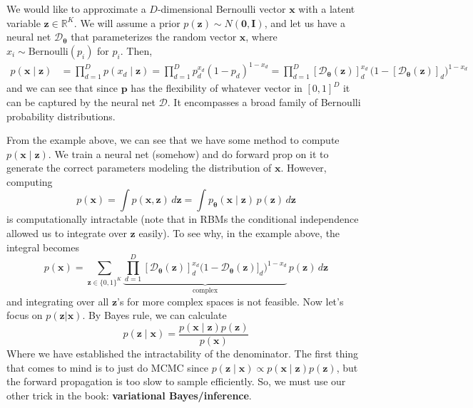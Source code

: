 \documentclass{article}
\begin{document}
    \begin{example} 
        We would like to approximate a $D$-dimensional Bernoulli vector $\mathbf{x}$ with a latent variable $\mathbf{z} \in \mathbb{R}^K$. We will assume a prior $p(\mathbf{z}) \sim N(\mathbf{0}, \mathbf{I})$, and let us have a neural net $\mathcal{D}_{\boldsymbol{\theta}}$ that parameterizes the random vector $\mathbf{x}$, where $x_i \sim \mathrm{Bernoulli}(p_i)$ for $p_i$. Then,
    \begin{align*}
        p(\mathbf{x} \mid \mathbf{z}) & = \prod_{d=1}^D p(x_d \mid \mathbf{z}) = \prod_{d=1}^D p_d^{x_d} (1 - p_d)^{1 - x_d} = \prod_{d=1}^D [\mathcal{D}_{\boldsymbol{\theta}} (\mathbf{z})]_d^{x_d} \, \big( 1 - [\mathcal{D}_{\boldsymbol{\theta}} (\mathbf{z})]_d\big)^{1 - x_d}
    \end{align*} 
    and we can see that since $\mathbf{p}$ has the flexibility of whatever vector in $[0, 1]^D$ it can be captured by the neural net $\mathcal{D}$. It encompasses a broad family of Bernoulli probability distributions. 
    \end{example}

    From the example above, we can see that we have some method to compute $p(\mathbf{x} \mid \mathbf{z})$. We train a neural net (somehow) and do forward prop on it to generate the correct parameters modeling the distribution of $\mathbf{x}$. However, computing 
    \[p(\mathbf{x}) = \int p(\mathbf{x}, \mathbf{z}) \,d\mathbf{z} = \int p_{\boldsymbol{\theta}} (\mathbf{x} \mid \mathbf{z}) \, p(\mathbf{z}) \,d\mathbf{z} \]
    is computationally intractable (note that in RBMs the conditional independence allowed us to integrate over $\mathbf{z}$ easily). To see why, in the example above, the integral becomes
    \[p(\mathbf{x}) = \sum_{\mathbf{z} \in \{0, 1\}^K} \underbrace{\prod_{d=1}^D [\mathcal{D}_{\boldsymbol{\theta}} (\mathbf{z})]_d^{x_d} \big( 1 - \mathcal{D}_{\boldsymbol{\theta}} (\mathbf{z})]_d \big)^{1 - x_d}}_{\text{complex}} \, p(\mathbf{z}) \, d\mathbf{z}\]
    and integrating over all $\mathbf{z}$'s for more complex spaces is not feasible. Now let's focus on $p(\mathbf{z} | \mathbf{x})$. By Bayes rule, we can calculate 
    \[p(\mathbf{z} \mid \mathbf{x}) = \frac{p(\mathbf{x} \mid \mathbf{z}) p(\mathbf{z})}{p(\mathbf{x})}\]
    Where we have established the intractability of the denominator. The first thing that comes to mind is to just do MCMC since $p(\mathbf{z} \mid \mathbf{x}) \propto p(\mathbf{x} \mid \mathbf{z}) p(\mathbf{z})$, but the forward propagation is too slow to sample efficiently. So, we must use our other trick in the book: \textbf{variational Bayes/inference}. 
\end{document}
